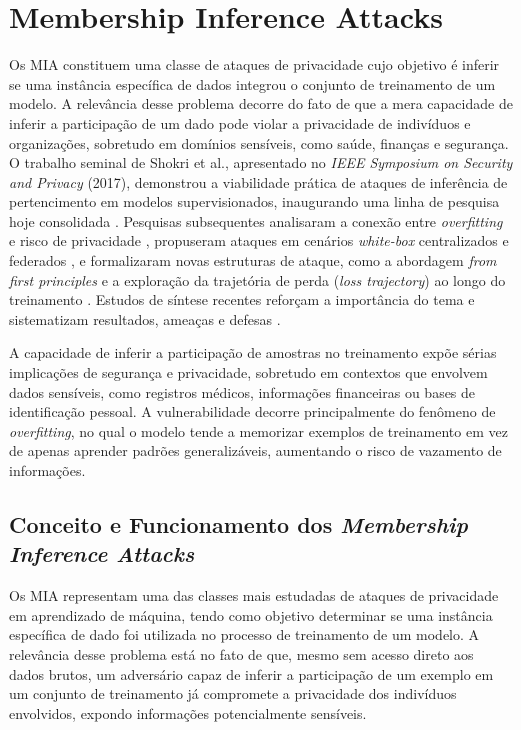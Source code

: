 \documentclass[
	12pt,				%
	openright,			%
	oneside,			%
	a4paper,			%
	english,			%
	french,				%
	spanish,			%
	brazil,				%
	]{abntex2}
\begin{document}
\section{Membership Inference Attacks}
Os MIA constituem uma classe de ataques de privacidade cujo objetivo é inferir se uma instância específica de dados integrou o conjunto de treinamento de um modelo. A relevância desse problema decorre do fato de que a mera capacidade de inferir a participação de um dado pode violar a privacidade de indivíduos e organizações, sobretudo em domínios sensíveis, como saúde, finanças e segurança. O trabalho seminal de Shokri et al., apresentado no \textit{IEEE Symposium on Security and Privacy} (2017), demonstrou a viabilidade prática de ataques de inferência de pertencimento em modelos supervisionados, inaugurando uma linha de pesquisa hoje consolidada \cite{shokri2017mia}. Pesquisas subsequentes analisaram a conexão entre \textit{overfitting} e risco de privacidade \cite{yeom2018privacyrisk}, propuseram ataques em cenários \textit{white-box} centralizados e federados \cite{nasr2019comprehensive}, e formalizaram novas estruturas de ataque, como a abordagem \textit{from first principles} \cite{carlini2022firstprinciples} e a exploração da trajetória de perda (\textit{loss trajectory}) ao longo do treinamento \cite{liu2022trajectory}. Estudos de síntese recentes reforçam a importância do tema e sistematizam resultados, ameaças e defesas \cite{bai2024survey}.


A capacidade de inferir a participação de amostras no treinamento expõe sérias implicações de segurança e privacidade, sobretudo em contextos que envolvem dados sensíveis, como registros médicos, informações financeiras ou bases de identificação pessoal. A vulnerabilidade decorre principalmente do fenômeno de \textit{overfitting}, no qual o modelo tende a memorizar exemplos de treinamento em vez de apenas aprender padrões generalizáveis, aumentando o risco de vazamento de informações.

\subsection{Conceito e Funcionamento dos \textit{Membership Inference Attacks}}

Os MIA representam uma das classes mais estudadas de ataques de privacidade em aprendizado de máquina, tendo como objetivo determinar se uma instância específica de dado foi utilizada no processo de treinamento de um modelo. A relevância desse problema está no fato de que, mesmo sem acesso direto aos dados brutos, um adversário capaz de inferir a participação de um exemplo em um conjunto de treinamento já compromete a privacidade dos indivíduos envolvidos, expondo informações potencialmente sensíveis. 
\end{document}
